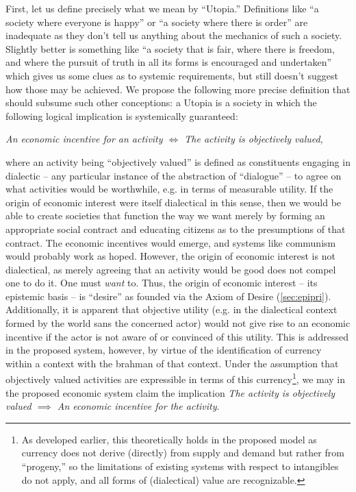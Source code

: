 \documentclass[pra,twocolumn,groupedaddress,10pt]{revtex4}
\theoremstyle{definition}
\begin{document}
First, let us define precisely what we mean by ``Utopia.'' Definitions like ``a society where everyone is happy'' or ``a society where there is order'' are inadequate as they don't tell us anything about the mechanics of such a society. Slightly better is something like ``a society that is fair, where there is freedom, and where the pursuit of truth in all its forms is encouraged and undertaken'' which gives us some clues as to systemic requirements, but still doesn't suggest how those may be achieved. We propose the following more precise definition that should subsume such other conceptions: a Utopia is a society in which the following logical implication is systemically guaranteed:

\emph{An economic incentive for an activity $\iff$ The activity is objectively valued,}

where an activity being ``objectively valued'' is defined as constituents engaging in dialectic -- any particular instance of the abstraction of ``dialogue'' -- to agree on what activities would be worthwhile, e.g. in terms of measurable utility. If the origin of economic interest were itself dialectical in this sense, then we would be able to create societies that function the way we want merely by forming an appropriate social contract and educating citizens as to the presumptions of that contract. The economic incentives would emerge, and systems like communism would probably work as hoped. However, the origin of economic interest is not dialectical, as merely agreeing that an activity would be good does not compel one to do it. One must \emph{want} to. Thus, the origin of economic interest -- its epistemic basis -- is ``desire'' as founded via the Axiom of Desire (\autoref{sec:epipri}). Additionally, it is apparent that objective utility (e.g. in the dialectical context formed by the world sans the concerned actor) would not give rise to an economic incentive if the actor is not aware of or convinced of this utility. This is addressed in the proposed system, however, by virtue of the identification of currency within a context with the brahman of that context. Under the assumption that objectively valued activities are expressible in terms of this currency\footnote{As developed earlier, this theoretically holds in the proposed model as currency does not derive (directly) from supply and demand but rather from ``progeny,'' so the limitations of existing systems with respect to intangibles do not apply, and all forms of (dialectical) value are recognizable.}, we may in the proposed economic system claim the implication \emph{The activity is objectively valued $\implies$ An economic incentive for the activity}.
\end{document}
